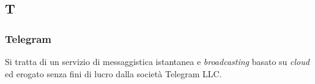 \subsection{T}

\subsubsection{Telegram}
Si tratta di un servizio di messaggistica istantanea e \textit{broadcasting}
basato su \textit{cloud} ed erogato senza fini di lucro dalla società Telegram
LLC.

\newpage
